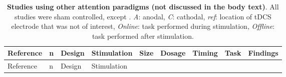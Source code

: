 \documentclass[11pt,]{memoir}
\begin{document}
\begin{longtable}[]{@{}lllllllll@{}}
\caption{\label{tab:other} \textbf{Studies using other attention paradigms (not discussed in the body text)}. All studies were sham controlled, except \textcite{London2015}. \emph{A}: anodal, \emph{C}: cathodal, \emph{ref}: location of tDCS electrode that was not of interest, \emph{Online}: task performed during stimulation, \emph{Offline}: task performed after stimulation.}\tabularnewline
\toprule
\begin{minipage}[b]{0.08\columnwidth}\raggedright
Reference\strut
\end{minipage} & \begin{minipage}[b]{0.03\columnwidth}\raggedright
n\strut
\end{minipage} & \begin{minipage}[b]{0.05\columnwidth}\raggedright
Design\strut
\end{minipage} & \begin{minipage}[b]{0.12\columnwidth}\raggedright
Stimulation\strut
\end{minipage} & \begin{minipage}[b]{0.04\columnwidth}\raggedright
Size\strut
\end{minipage} & \begin{minipage}[b]{0.05\columnwidth}\raggedright
Dosage\strut
\end{minipage} & \begin{minipage}[b]{0.05\columnwidth}\raggedright
Timing\strut
\end{minipage} & \begin{minipage}[b]{0.08\columnwidth}\raggedright
Task\strut
\end{minipage} & \begin{minipage}[b]{0.27\columnwidth}\raggedright
Findings\strut
\end{minipage}\tabularnewline
\midrule
\endfirsthead
\toprule
\begin{minipage}[b]{0.08\columnwidth}\raggedright
Reference\strut
\end{minipage} & \begin{minipage}[b]{0.03\columnwidth}\raggedright
n\strut
\end{minipage} & \begin{minipage}[b]{0.05\columnwidth}\raggedright
Design\strut
\end{minipage} & \begin{minipage}[b]{0.12\columnwidth}\raggedright
Stimulation\strut
\end{minipage} & \begin{minipage}[b]{0.04\columnwidth}\raggedright

\end{minipage}
\end{longtable}
\end{document}
